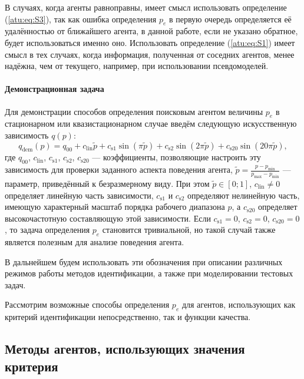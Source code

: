 В случаях, когда агенты равноправны, имеет смысл использовать определение (\ref{atu:eq:S3}),
так как ошибка определения $p_e$ в первую очередь определяется
её удалённостью от ближайшего агента, в данной работе, если не указано обратное,
будет использоваться именно оно. Использовать определение (\ref{atu:eq:S1}) имеет смысл в тех случаях,
когда информация, полученная от соседних агентов, менее надёжна, чем от текущего,
например, при использовании псевдомоделей.




\paragraph{Демонстрационная задача}

Для демонстрации способов определения поисковым агентом
величины $p_e$ в стационарном или квазистационарном случае
введём следующую искусственную зависимость $q(p)$:
%
\begin{equation}
  q_\mathrm{dem}(p) = q_{00} + c_\mathrm{lin} \tilde{p} + c_\mathrm{s1} \sin( \pi \tilde{p} ) + c_\mathrm{s2} \sin( 2 \pi \tilde{p} ) + c_\mathrm{s20} \sin( 20 \pi \tilde{p} ),
  \label{atu:eq:q_dem}
\end{equation}
%
где $q_{00}$, $c_\mathrm{lin}$, $c_\mathrm{s1}$, $c_\mathrm{s2}$, $c_\mathrm{s20}$
--- коэффициенты, позволяющие
настроить эту зависимость для проверки заданного аспекта поведения агента,
$ \tilde{p} = \frac{p - p_{\min}}{p_{\max} - p_{\min}} $ --- параметр, приведённый к безразмерному виду.
При этом $\tilde{p} \in[0;1]$, $c_\mathrm{lin} \ne 0$ определяет линейную часть зависимости,
$c_\mathrm{s1}$ и $c_\mathrm{s2}$ определяют нелинейную часть, имеющую характерный масштаб
порядка рабочего диапазона $p$,
а $c_\mathrm{s20}$ определяет высокочастотную составляющую этой зависимости.
Если $c_\mathrm{s1} = 0$, $c_\mathrm{s2}=0$, $c_\mathrm{s20}=0$,
то задача определения $p_e$ становится тривиальной,
но такой случай также является полезным для анализе поведения агента.

В дальнейшем будем использовать эти обозначения при описании
различных режимов работы методов идентификации, а также
при моделировании тестовых задач.

Рассмотрим возможные способы определения $p_e$ для агентов,
использующих как критерий идентификации непосредственно,
так и функции качества.



\subsection{Методы агентов, использующих значения критерия }  %

